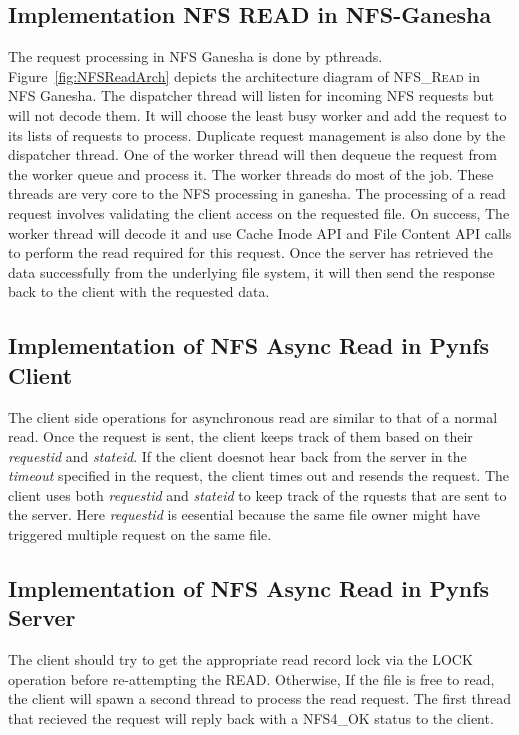 \subsection{Implementation NFS READ in NFS-Ganesha}

 The request processing in NFS Ganesha is done by pthreads. Figure~\ref{fig:NFSReadArch} depicts the architecture diagram of \textsc{NFS\_Read} in NFS Ganesha. The dispatcher thread will listen for incoming NFS requests but will not decode them. It will choose the least busy worker and add the request to its lists of requests to process. Duplicate
request management is also done by the dispatcher thread. One of the worker thread will then dequeue the request from the worker queue and process it. The worker threads do most of the job. These threads are very core to the NFS processing in ganesha. The processing of a read request involves validating the client access on the requested file. On success, The worker thread will decode it and use Cache Inode API and File Content API calls to perform the read required for this request. Once the server has retrieved the data successfully from the underlying file system, it will then send the response back to the client with the requested data.
 
\subsection{Implementation of NFS Async Read in Pynfs Client}
 
The client side operations for asynchronous read are similar to that of a normal read. Once the request is sent, the client keeps track of them based on their \textit{requestid} and \textit{stateid}. If the client doesnot hear back from the server in the \textit{timeout} specified in the request, the client times out and resends the request. The client uses both \textit{requestid} and \textit{stateid} to keep track of the rquests that are sent to the server.  Here \textit{requestid} is eesential because the same file owner might have triggered multiple request on the same file.  
  
\subsection{Implementation of NFS Async Read in Pynfs Server}
  The client should try to get the appropriate read record lock via the LOCK operation before re-attempting the READ. Otherwise, If the file is free to read, the client will spawn a second thread to process the read request. The first thread that recieved the request will reply back with a NFS4\_OK status to the client.
    

